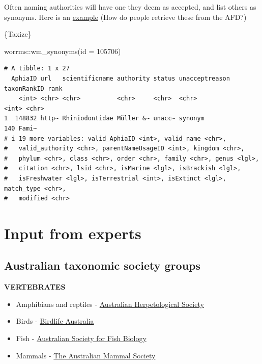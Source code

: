 \documentclass[
  letterpaper,
  DIV=11,
  numbers=noendperiod,
  oneside]{scrreprt}
\newenvironment{Shaded}{\begin{snugshade}}{\end{snugshade}}
\newcommand{\AttributeTok}[1]{\textcolor[rgb]{0.40,0.45,0.13}{#1}}
\newcommand{\DecValTok}[1]{\textcolor[rgb]{0.68,0.00,0.00}{#1}}
\newcommand{\FunctionTok}[1]{\textcolor[rgb]{0.28,0.35,0.67}{#1}}
\newcommand{\NormalTok}[1]{\textcolor[rgb]{0.00,0.23,0.31}{#1}}
\newcommand{\SpecialCharTok}[1]{\textcolor[rgb]{0.37,0.37,0.37}{#1}}
\providecommand{\tightlist}{%
  \setlength{\itemsep}{0pt}\setlength{\parskip}{0pt}}\usepackage{longtable,booktabs,array}
\begin{document}
Often naming authorities will have one they deem as accepted, and list
others as synonyms. Here is an
\href{https://biodiversity.org.au/afd/taxa/Egernia/names}{example} (How
do people retrieve these from the AFD?)

\{Taxize\}

\begin{Shaded}
\begin{Highlighting}[]
\NormalTok{worrms}\SpecialCharTok{::}\FunctionTok{wm\_synonyms}\NormalTok{(}\AttributeTok{id =} \DecValTok{105706}\NormalTok{)}
\end{Highlighting}
\end{Shaded}

\begin{verbatim}
# A tibble: 1 x 27
  AphiaID url   scientificname authority status unacceptreason taxonRankID rank 
    <int> <chr> <chr>          <chr>     <chr>  <chr>                <int> <chr>
1  148832 http~ Rhiniodontidae Müller &~ unacc~ synonym                140 Fami~
# i 19 more variables: valid_AphiaID <int>, valid_name <chr>,
#   valid_authority <chr>, parentNameUsageID <int>, kingdom <chr>,
#   phylum <chr>, class <chr>, order <chr>, family <chr>, genus <lgl>,
#   citation <chr>, lsid <chr>, isMarine <lgl>, isBrackish <lgl>,
#   isFreshwater <lgl>, isTerrestrial <int>, isExtinct <lgl>, match_type <chr>,
#   modified <chr>
\end{verbatim}

\hypertarget{input-from-experts}{%
\section{Input from experts}\label{input-from-experts}}

\hypertarget{australian-taxonomic-society-groups}{%
\subsection{Australian taxonomic society
groups}\label{australian-taxonomic-society-groups}}

\textbf{VERTEBRATES}

\begin{itemize}
\tightlist
\item
  Amphibians and reptiles - \href{https://ahs.org.au/}{Australian
  Herpetological Society}\\
\item
  Birds - \href{https://www.birdlife.org.au/}{Birdlife Australia}\\
\item
  Fish - \href{https://www.asfb.org.au/}{Australian Society for Fish
  Biology}\\
\item
  Mammals - \href{https://australianmammals.org.au/}{The Australian
  Mammal Society}
\end{itemize}
\end{document}
